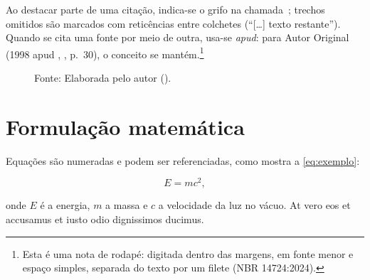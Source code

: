 Ao destacar parte de uma citação, indica-se o grifo na
chamada~\parencite[p.~22, grifo nosso]{exemplo-artigo}; trechos omitidos são
marcados com reticências entre colchetes (\enquote{[\ldots] texto restante}).
Quando se cita uma fonte por meio de outra, usa-se \emph{apud}: para Autor
Original (1998 apud \citeauthor{exemplo-dissertacao}, \citeyear{exemplo-dissertacao},
p.~30), o conceito se mantém.\footnote{Esta é uma nota de rodapé: digitada dentro
das margens, em fonte menor e espaço simples, separada do texto por um filete
(NBR 14724:2024).}

\begin{figure}[!htb]
  \centering
    {Fonte: Elaborada pelo autor (\the\year{}).}
\end{figure}

\section{Formulação matemática}
\label{sec:formulacao}

Equações são numeradas e podem ser referenciadas, como mostra a
\autoref{eq:exemplo}:

\begin{equation}
  E = m c^{2},
  \label{eq:exemplo}
\end{equation}

\noindent onde $E$ é a energia, $m$ a massa e $c$ a velocidade da luz no vácuo.
At vero eos et accusamus et iusto odio dignissimos ducimus.

